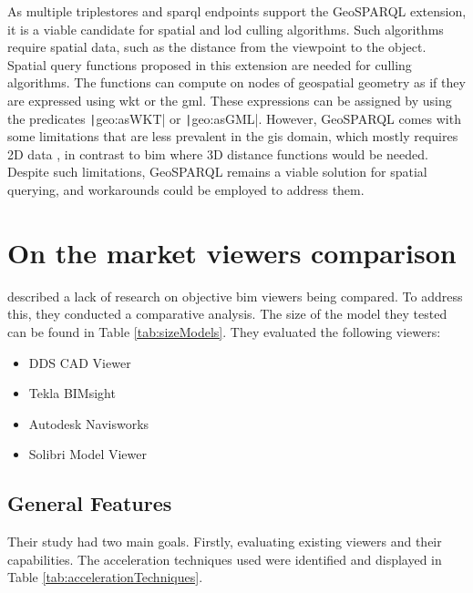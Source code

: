 As multiple triplestores and \ac{sparql} endpoints support the GeoSPARQL extension, it is a viable candidate for spatial and \ac{lod} culling algorithms. Such algorithms require spatial data, such as the distance from the viewpoint to the object. Spatial query functions proposed in this extension are needed for culling algorithms. The functions can compute on nodes of geospatial geometry as if they are expressed using \ac{wkt} or the \ac{gml}. These expressions can be assigned by using the predicates \texttt|geo:asWKT| or \texttt|geo:asGML|. However, GeoSPARQL comes with some limitations that are less prevalent in the \ac{gis} domain, which mostly requires 2D data \parencite{perry2012ogc}, in contrast to \ac{bim} where 3D distance functions would be needed. Despite such limitations, GeoSPARQL remains a viable solution for spatial querying, and workarounds could be employed to address them.

\section{On the market viewers comparison}
\cite{Johansson2015} described a lack of research on objective \ac{bim} viewers being compared. To address this, they conducted a comparative analysis. The size of the model they tested can be found in Table \ref{tab:sizeModels}. They evaluated the following viewers:
\begin{itemize}
    \item DDS CAD Viewer
    \item Tekla BIMsight
    \item Autodesk Navisworks
    \item Solibri Model Viewer
\end{itemize}

\subsection{General Features}
Their study had two main goals. Firstly, evaluating existing viewers and their capabilities. The acceleration techniques used were identified and displayed in Table \ref{tab:accelerationTechniques}.

